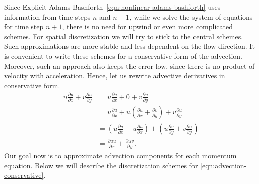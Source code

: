 \documentclass{article}
\numberwithin{equation}{section}
\begin{document}
Since Explicit Adams-Bashforth~\cref{eqn:nonlinear-adams-bashforth} uses information from time steps $n$ and $n-1$, while we solve the system of equations for time step $n+1$, there is no need for upwind or even more complicated schemes. 
For spatial discretization we will try to stick to the central schemes. 
Such approximations are more stable and less dependent on the flow direction. 
It is convenient to write these schemes for a conservative form of the advection. 
Moreover, such an approach also keeps the error low, since there is no product of velocity with acceleration. 
Hence, let us rewrite advective derivatives in conservative form. 
\begin{align}\label{eqn:advection-conservative}
	u\frac{\partial u}{\partial x}+v \frac{\partial u}{\partial y}
	&=u\frac{\partial u}{\partial x}+0+v \frac{\partial u}{\partial y}\nonumber\\
	&= u\frac{\partial u}{\partial x}+ u\left(\frac{\partial u}{\partial x} +\frac{\partial v}{\partial y}\right ) +v \frac{\partial u}{\partial y}\nonumber\\
	&=\left(u\frac{\partial u}{\partial x}+ u\frac{\partial u}{\partial x}\right ) +\left(u\frac{\partial v}{\partial y} +v \frac{\partial u}{\partial y}\right )\nonumber\\
	&=\frac{\partial uu}{\partial x}+ \frac{\partial uv}{\partial y}.
\end{align}
Our goal now is to approximate advection components for each momentum equation. Below we will describe the discretization schemes for \cref{eqn:advection-conservative}. 
\end{document}
